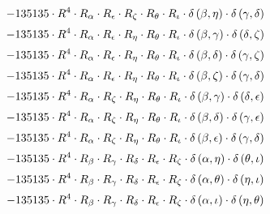 \begin{subequations}
\begin{gather}
 \\[0.2em] \notag 		 - 135135 \cdot R^{4} \cdot R_{\alpha{}} \cdot R_{\epsilon{}} \cdot R_{\zeta{}} \cdot R_{\theta{}} \cdot R_{\iota{}} \cdot \delta{}\left(\beta{}, \eta{}\right) \cdot \delta{}\left(\gamma{}, \delta{}\right) 
 \\[0.2em] \notag 		 - 135135 \cdot R^{4} \cdot R_{\alpha{}} \cdot R_{\epsilon{}} \cdot R_{\eta{}} \cdot R_{\theta{}} \cdot R_{\iota{}} \cdot \delta{}\left(\beta{}, \gamma{}\right) \cdot \delta{}\left(\delta{}, \zeta{}\right) 
 \\[0.2em] \notag 		 - 135135 \cdot R^{4} \cdot R_{\alpha{}} \cdot R_{\epsilon{}} \cdot R_{\eta{}} \cdot R_{\theta{}} \cdot R_{\iota{}} \cdot \delta{}\left(\beta{}, \delta{}\right) \cdot \delta{}\left(\gamma{}, \zeta{}\right) 
 \\[0.2em] \notag 		 - 135135 \cdot R^{4} \cdot R_{\alpha{}} \cdot R_{\epsilon{}} \cdot R_{\eta{}} \cdot R_{\theta{}} \cdot R_{\iota{}} \cdot \delta{}\left(\beta{}, \zeta{}\right) \cdot \delta{}\left(\gamma{}, \delta{}\right) 
 \\[0.2em] \notag 		 - 135135 \cdot R^{4} \cdot R_{\alpha{}} \cdot R_{\zeta{}} \cdot R_{\eta{}} \cdot R_{\theta{}} \cdot R_{\iota{}} \cdot \delta{}\left(\beta{}, \gamma{}\right) \cdot \delta{}\left(\delta{}, \epsilon{}\right) 
 \\[0.2em] \notag 		 - 135135 \cdot R^{4} \cdot R_{\alpha{}} \cdot R_{\zeta{}} \cdot R_{\eta{}} \cdot R_{\theta{}} \cdot R_{\iota{}} \cdot \delta{}\left(\beta{}, \delta{}\right) \cdot \delta{}\left(\gamma{}, \epsilon{}\right) 
 \\[0.2em] \notag 		 - 135135 \cdot R^{4} \cdot R_{\alpha{}} \cdot R_{\zeta{}} \cdot R_{\eta{}} \cdot R_{\theta{}} \cdot R_{\iota{}} \cdot \delta{}\left(\beta{}, \epsilon{}\right) \cdot \delta{}\left(\gamma{}, \delta{}\right) 
 \\[0.2em] \notag 		 - 135135 \cdot R^{4} \cdot R_{\beta{}} \cdot R_{\gamma{}} \cdot R_{\delta{}} \cdot R_{\epsilon{}} \cdot R_{\zeta{}} \cdot \delta{}\left(\alpha{}, \eta{}\right) \cdot \delta{}\left(\theta{}, \iota{}\right) 
 \\[0.2em] \notag 		 - 135135 \cdot R^{4} \cdot R_{\beta{}} \cdot R_{\gamma{}} \cdot R_{\delta{}} \cdot R_{\epsilon{}} \cdot R_{\zeta{}} \cdot \delta{}\left(\alpha{}, \theta{}\right) \cdot \delta{}\left(\eta{}, \iota{}\right) 
 \\[0.2em] \notag 		 - 135135 \cdot R^{4} \cdot R_{\beta{}} \cdot R_{\gamma{}} \cdot R_{\delta{}} \cdot R_{\epsilon{}} \cdot R_{\zeta{}} \cdot \delta{}\left(\alpha{}, \iota{}\right) \cdot \delta{}\left(\eta{}, \theta{}\right) 

\end{gather}
\end{subequations}
